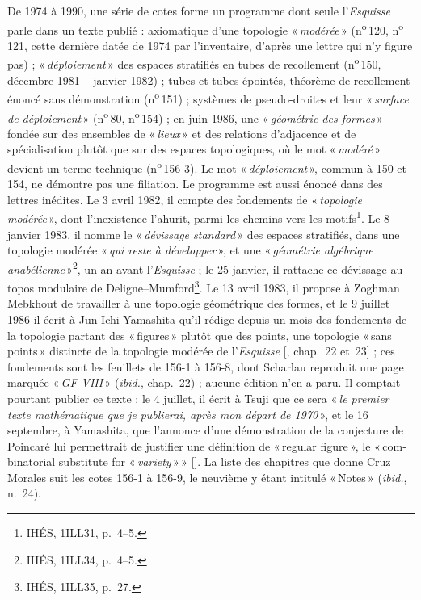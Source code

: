 \documentclass[11pt]{amsart}
\newcommand{\q}[1]{«\,\textit{#1}\,»}
\newcommand{\mot}[1]{«\,#1\,»}
\newcommand{\cote}[1]{\mbox{n\textsuperscript{o}\,#1}}
\begin{document}
De 1974 à 1990, une série de cotes forme un programme dont seule l'\emph{Esquisse} parle dans un texte publié : axiomatique d'une topologie \q{modérée} (\cote{120}, \cote{121}, cette dernière datée de 1974 par l'inventaire, d'après une lettre qui n'y figure pas) ; \q{déploiement} des espaces stratifiés en tubes de recollement (\cote{150}, décembre 1981 -- janvier 1982) ; tubes et tubes épointés, théorème de recollement énoncé sans démonstration (\cote{151}) ; systèmes de pseudo-droites et leur \q{surface de déploiement} (\cote{80}, \cote{154}) ; en juin 1986, une \q{géométrie des formes} fondée sur des ensembles de \q{lieux} et des relations d'adjacence et de spécialisation plutôt que sur des espaces topologiques, où le mot \q{modéré} devient un terme technique (\cote{156-3}). Le mot \q{déploiement}, commun à 150 et 154, ne démontre pas une filiation. Le programme est aussi énoncé dans des lettres inédites. Le 3 avril 1982, il compte des fondements de \q{topologie modérée}, dont l'inexistence l'ahurit, parmi les chemins vers les motifs\footnote{IHÉS, 1ILL31, p.~4--5.}. Le 8 janvier 1983, il nomme le \q{dévissage standard} des espaces stratifiés, dans une topologie modérée \q{qui reste à développer}, et une \q{géométrie algébrique anabélienne}\footnote{IHÉS, 1ILL34, p.~4--5.}, un an avant l'\emph{Esquisse} ; le 25 janvier, il rattache ce dévissage au topos modulaire de Deligne--Mumford\footnote{IHÉS, 1ILL35, p.~27.}. Le 13 avril 1983, il propose à Zoghman Mebkhout de travailler à une topologie géométrique des formes, et le 9 juillet 1986 il écrit à Jun-Ichi Yamashita qu'il rédige depuis un mois des fondements de la topologie partant des \mot{\foreignlanguage{english}{figures}} plutôt que des points, une topologie \mot{sans points} distincte de la topologie modérée de l'\emph{Esquisse} [\citealp{circle-spirit}, chap.~22 et~23] ; ces fondements sont les feuillets de 156-1 à 156-8, dont Scharlau reproduit une page marquée \q{GF VIII} (\emph{ibid.}, chap.~22) ; aucune édition n'en a paru. Il comptait pourtant publier ce texte : le 4 juillet, il écrit à Tsuji que ce sera \q{le premier texte mathématique que je publierai, après mon départ de 1970}, et le 16 septembre, à Yamashita, que l'annonce d'une démonstration de la conjecture de Poincaré lui permettrait de justifier une définition de \mot{\foreignlanguage{english}{regular figure}}, le \mot{\foreignlanguage{english}{combinatorial substitute for \q{variety}}} [\citealp{cruzmorales2021}]. La liste des chapitres que donne Cruz Morales suit les cotes 156-1 à 156-9, le neuvième y étant intitulé \mot{\foreignlanguage{english}{Notes}} (\emph{ibid.}, n.~24).
\end{document}
